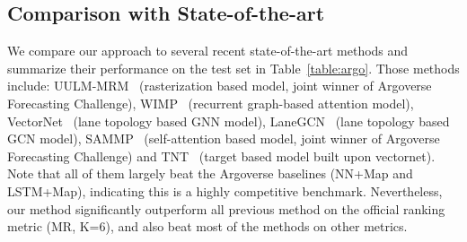 \subsection{Comparison with State-of-the-art}
We compare our approach to several recent state-of-the-art methods and summarize
their performance on the test set in Table~\ref{table:argo}. Those methods
include: UULM-MRM~\cite{argoleaderboard} (rasterization based model, joint winner
of Argoverse Forecasting Challenge), WIMP~\cite{wimp} (recurrent graph-based
attention model), VectorNet~\cite{vectornet} (lane topology based GNN model),
LaneGCN~\cite{lgn} (lane topology based GCN model),
SAMMP~\cite{mercat2020multi} (self-attention based model, joint winner of
Argoverse Forecasting Challenge) and TNT~\cite{tnt} (target based model built
upon vectornet). Note that all of them largely beat the Argoverse baselines
(NN+Map and LSTM+Map), indicating this is a highly competitive benchmark.
Nevertheless, our method significantly outperform all previous method on the
official ranking metric (MR, K=6), and also beat most of the methods on other
metrics. 


